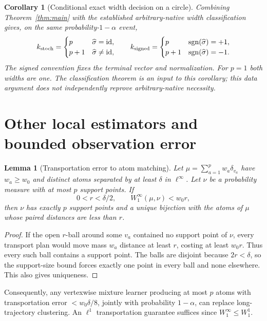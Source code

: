 \documentclass[11pt]{article}
\newtheorem{lemma}[theorem]{Lemma}
\newtheorem{corollary}[theorem]{Corollary}
\theoremstyle{remark}\newtheorem{remark}[theorem]{Remark}
\newcommand{\id}{\mathrm{id}}
\begin{document}
\begin{corollary}[Conditional exact width decision on a circle]
Combining Theorem~\ref{thm:main} with the established arbitrary-native width classification gives, on the same probability-$1-\alpha$ event,
\[
 k_{\rm stoch}=\begin{cases}p&\widehat\sigma=\id,\\p+1&\widehat\sigma\ne\id,\end{cases}
 \qquad
 k_{\rm signed}=\begin{cases}p&\operatorname{sgn}(\widehat\sigma)=+1,\\p+1&\operatorname{sgn}(\widehat\sigma)=-1.\end{cases}
\]
The signed convention fixes the terminal vector and normalization. For $p=1$ both widths are one. The classification theorem is an input to this corollary; this data argument does not independently reprove arbitrary-native necessity.
\end{corollary}

\section{Other local estimators and bounded observation error}
\begin{lemma}[Transportation error to atom matching]\label{lem:wasserstein}
Let $\mu=\sum_{a=1}^p w_a\delta_{v_a}$ have $w_a\geq w_0$ and distinct atoms separated by at least $\delta$ in $\ell^\infty$. Let $\nu$ be a probability measure with at most $p$ support points. If
\[
 0<r<\delta/2,\qquad W_1^{\infty}(\mu,\nu)<w_0r,
\]
then $\nu$ has exactly $p$ support points and a unique bijection with the atoms of $\mu$ whose paired distances are less than $r$.
\end{lemma}
\begin{proof}
If the open $r$-ball around some $v_a$ contained no support point of $\nu$, every transport plan would move mass $w_a$ distance at least $r$, costing at least $w_0r$. Thus every such ball contains a support point. The balls are disjoint because $2r<\delta$, so the support-size bound forces exactly one point in every ball and none elsewhere. This also gives uniqueness.
\end{proof}
Consequently, any vertexwise mixture learner producing at most $p$ atoms with transportation error $<w_0\delta/8$, jointly with probability $1-\alpha$, can replace long-trajectory clustering. An $\ell^1$ transportation guarantee suffices since $W_1^{\infty}\leq W_1^1$.
\end{document}
